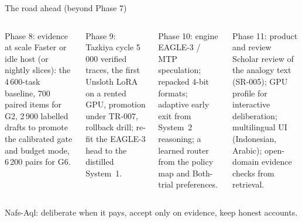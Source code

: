 \documentclass[aspectratio=169,10pt]{beamer}
\begin{document}
\begin{frame}{The road ahead (beyond Phase 7)}
\scriptsize
\begin{columns}[T]
\begin{block}{Phase 8: evidence at scale}
Faster or idle host (or nightly slices): the 4\,600-task baseline, 700 paired items for G2, 2\,900 labelled drafts to promote the calibrated gate and budget mode, 6\,200 pairs for G6.
\end{block}
\begin{block}{Phase 9: Tazkiya cycle}
5\,000 verified traces, the first Unsloth LoRA on a rented GPU, promotion under TR-007, rollback drill; re-fit the EAGLE-3 head to the distilled System~1.
\end{block}
\begin{block}{Phase 10: engine}
EAGLE-3 / MTP speculation; repacked 4-bit formats; adaptive early exit from System~2 reasoning; a learned router from the policy map and Both-trial preferences.
\end{block}
\begin{block}{Phase 11: product and review}
Scholar review of the analogy text (SR-005); GPU profile for interactive deliberation; multilingual UI (Indonesian, Arabic); open-domain evidence checks from retrieval.
\end{block}
\end{columns}
\end{frame}

\begin{frame}[standout]
Nafs-Aql: deliberate when it pays, accept only on evidence, keep honest accounts.
\end{frame}
\end{document}
